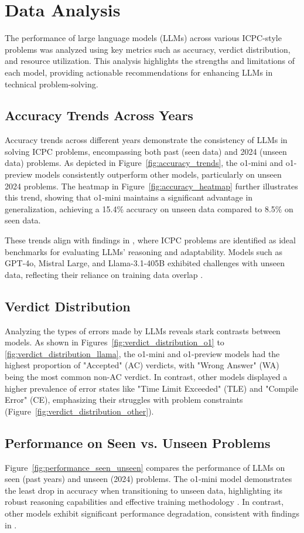 \section{Data Analysis}
The performance of large language models (LLMs) across various ICPC-style problems was analyzed using key metrics such as accuracy, verdict distribution, and resource utilization. This analysis highlights the strengths and limitations of each model, providing actionable recommendations for enhancing LLMs in technical problem-solving.

\subsection{Accuracy Trends Across Years}
Accuracy trends across different years demonstrate the consistency of LLMs in solving ICPC problems, encompassing both past (seen data) and 2024 (unseen data) problems. As depicted in Figure~\ref{fig:accuracy_trends}, the o1-mini and o1-preview models consistently outperform other models, particularly on unseen 2024 problems. The heatmap in Figure~\ref{fig:accuracy_heatmap} further illustrates this trend, showing that o1-mini maintains a significant advantage in generalization, achieving a 15.4\% accuracy on unseen data compared to 8.5\% on seen data.

These trends align with findings in \cite{b1}, where ICPC problems are identified as ideal benchmarks for evaluating LLMs' reasoning and adaptability. Models such as GPT-4o, Mistral Large, and Llama-3.1-405B exhibited challenges with unseen data, reflecting their reliance on training data overlap \cite{b27}.

\subsection{Verdict Distribution}
Analyzing the types of errors made by LLMs reveals stark contrasts between models. As shown in Figures~\ref{fig:verdict_distribution_o1} to \ref{fig:verdict_distribution_llama}, the o1-mini and o1-preview models had the highest proportion of "Accepted" (AC) verdicts, with "Wrong Answer" (WA) being the most common non-AC verdict. In contrast, other models displayed a higher prevalence of error states like "Time Limit Exceeded" (TLE) and "Compile Error" (CE), emphasizing their struggles with problem constraints (Figure~\ref{fig:verdict_distribution_other}).

\subsection{Performance on Seen vs. Unseen Problems}
Figure~\ref{fig:performance_seen_unseen} compares the performance of LLMs on seen (past years) and unseen (2024) problems. The o1-mini model demonstrates the least drop in accuracy when transitioning to unseen data, highlighting its robust reasoning capabilities and effective training methodology \cite{b3,b4}. In contrast, other models exhibit significant performance degradation, consistent with findings in \cite{b2}.

